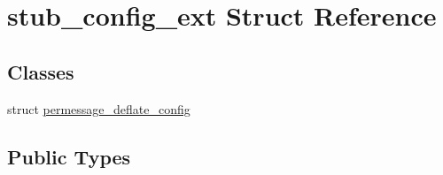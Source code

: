 \hypertarget{structstub__config__ext}{}\section{stub\+\_\+config\+\_\+ext Struct Reference}
\label{structstub__config__ext}
\subsection*{Classes}
\begin{DoxyCompactItemize}
\item 
struct \hyperlink{structstub__config__ext_1_1permessage__deflate__config}{permessage\+\_\+deflate\+\_\+config}
\end{DoxyCompactItemize}
\subsection*{Public Types}
